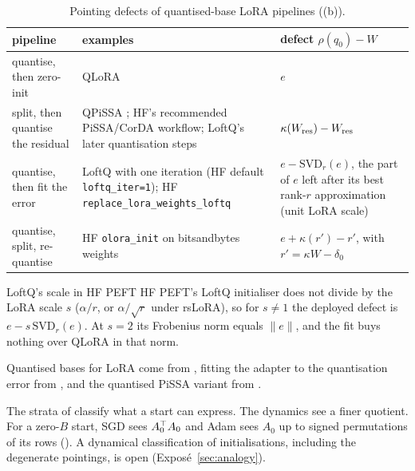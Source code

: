 \begin{table}[!tbp]
  \centering
  \footnotesize
  \caption{Pointing defects of quantised-base LoRA pipelines ((b)).}
  \label{tab:defects}
  \renewcommand{\arraystretch}{1.15}
  \begin{tabularx}{\linewidth}{@{}>{\raggedright\arraybackslash}p{3.3cm}>{\raggedright\arraybackslash}X>{\raggedright\arraybackslash}p{4.3cm}@{}}
    \toprule
    \headrow \textbf{pipeline} & \textbf{examples} & \textbf{defect $\rho(q_0)-W$} \\
    \midrule
    quantise, then zero-init & QLoRA \citep{dettmers2023qlora} & $e$ \\
    split, then quantise the residual &
      QPiSSA \citep{meng2024pissa}; HF's recommended PiSSA/CorDA workflow; LoftQ's later quantisation steps &
      $\kappa(W_{\rm res})-W_{\rm res}$ \\
    quantise, then fit the error &
      LoftQ \citep{li2023loftq} with one iteration (HF default \texttt{loftq\_iter=1}); HF
      \texttt{replace\_lora\_\allowbreak weights\_loftq} &
      $e-\mathrm{SVD}_r(e)$, the part of $e$ left after its best rank-$r$ approximation (unit LoRA scale) \\
    quantise, split, re-quantise & HF \texttt{olora\_init} on bitsandbytes weights &
      $e+\kappa(r')-r'$, with $r'=\kappa W-\delta_0$ \\
    \bottomrule
  \end{tabularx}
\end{table}

\begin{remark*}{LoftQ's scale in HF PEFT}
HF PEFT's LoftQ initialiser does not divide by the LoRA scale $s$ ($\alpha/r$, or $\alpha/\sqrt r$ under rsLoRA), so
for $s\ne1$ the deployed defect is $e-s\,\mathrm{SVD}_r(e)$. At $s=2$ its Frobenius norm equals $\|e\|$, and the fit
buys nothing over QLoRA in that norm.
\end{remark*}

Quantised bases for LoRA come from \citet{dettmers2023qlora}, fitting the adapter to the quantisation error from
\citet{li2023loftq}, and the quantised PiSSA variant from \citet{meng2024pissa}.

The strata of  classify what a start can express. The dynamics see a finer quotient. For a
zero-$B$ start, SGD sees $A_0^{\top} A_0$ and Adam sees $A_0$ up to signed permutations of its rows
(). A dynamical classification of initialisations, including the degenerate pointings, is
open (Exposé~\ref{sec:analogy}).
